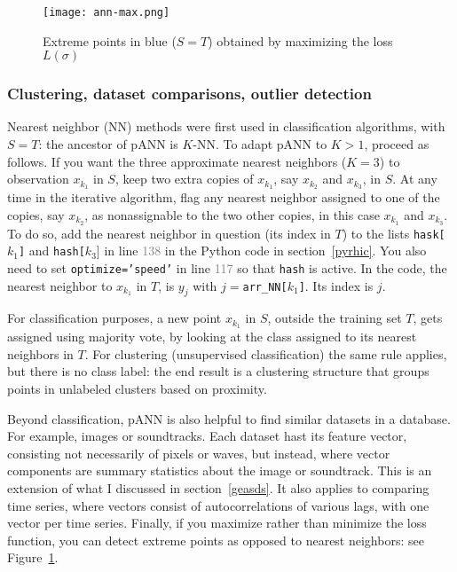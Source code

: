 \documentclass[oneside,10pt]{book}
\begin{document}
\begin{figure}[H]
\centering
\texttt{[image: ann-max.png]}
\caption{Extreme points in blue ($S=T$) obtained by maximizing the loss $L(\sigma)$}
\label{fig:z0m4rlp9ut}
\end{figure}

\subsubsection{Clustering, dataset comparisons, outlier detection}\label{bodong}

Nearest neighbor (NN) methods were first used in classification algorithms, with $S=T$: the ancestor of pANN is $K$-NN. 
To adapt pANN to $K>1$, proceed as follows. If you want the three approximate nearest neighbors ($K=3$) to observation 
$x_{k_1}$ in $S$, keep two extra copies of $x_{k_1}$,
 say $x_{k_2}$ and $x_{k_3}$, in $S$. At any time in the iterative algorithm, flag any nearest neighbor assigned to one of the copies,  say $x_{k_2}$, as nonassignable to the two other copies, in this case $x_{k_1}$ and $x_{k_3}$. To do so, 
 add the nearest neighbor in question (its index in $T$) 
to the lists \texttt{hask[$k_1$]} and \texttt{hash[$k_3]$} in line \textcolor{gray}{138} in the Python code
 in section~\ref{pyrhic}. You also need to set \texttt{optimize='speed'} in line \textcolor{gray}{117} so that \texttt{hash} is active. 
In the code, the nearest neighbor to $x_{k_1}$ in $T$, is $y_j$ with $j=$\texttt{arr\_NN[$k_1$]}. Its index is $j$.

For classification purposes, a new point $x_{k_1}$ in $S$, outside the training set $T$, gets assigned using majority vote, by looking at the class assigned to its nearest neighbors in $T$. For clustering (unsupervised classification) the same rule applies, but there is no class label: the end result is a clustering structure that groups points in unlabeled clusters based on proximity. 

Beyond classification, pANN is also helpful to find similar datasets in a database. For example, images 
 or soundtracks. Each dataset hast its feature vector, consisting not necessarily of pixels or waves, but  instead, where 
vector components are summary statistics about the image or soundtrack. 
 This is an extension of what I discussed in section~\ref{geasds}. It also applies to comparing time series, where 
vectors consist of autocorrelations of various lags, with one vector per time series.   
Finally, if you maximize rather than minimize the loss function, you can detect extreme points as opposed to nearest neighbors: see Figure~\ref{fig:z0m4rlp9ut}.
\end{document}
